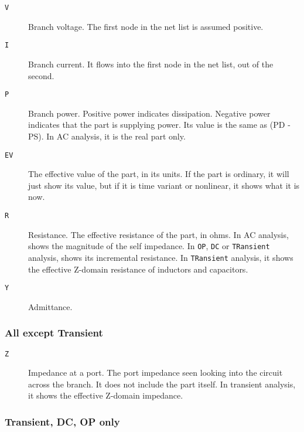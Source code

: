 \begin{description}

\item[{\tt V}] Branch voltage.  The first node in the net list is assumed
positive.

\item[{\tt I}] Branch current.  It flows into the first node in the net
list, out of the second.

\item[{\tt P}] Branch power.  Positive power indicates dissipation. 
Negative power indicates that the part is supplying power.  Its value 
is the same as (PD - PS).  In AC analysis, it is the real part only.

\item[{\tt EV}] The effective value of the part, in its units.  If the part
is ordinary, it will just show its value, but if it is time variant or
nonlinear, it shows what it is now.

\item[{\tt R}] Resistance.  The effective resistance of the part, in ohms.
In AC analysis, shows the magnitude of the self impedance.  In {\tt OP},
{\tt DC} or {\tt TRansient} analysis, shows its incremental resistance.  In
{\tt TRansient} analysis, it shows the effective Z-domain resistance of
inductors and capacitors.

\item[{\tt Y}] Admittance.

\end{description}
\subsubsection{All except Transient}

\begin{description}

\item[{\tt Z}] Impedance at a port.  The port impedance seen looking into
the circuit across the branch.  It does not include the part itself.  In 
transient analysis, it shows the effective Z-domain impedance.

\end{description}
\subsubsection{Transient, DC, OP only}

